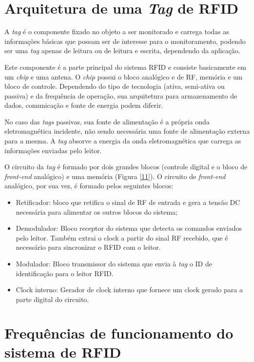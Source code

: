 
\section{Arquitetura de uma \textit{Tag} de RFID}

A \textit{tag} é o componente fixado no objeto a ser monitorado e carrega todas as informações básicas que possam ser de interesse para o monitoramento, podendo ser uma \textit{tag} apenas de leitura ou de leitura e escrita, dependendo da aplicação.

Este componente é a parte principal do sistema RFID e consiste basicamente em um \textit{chip} e uma antena. O \textit{chip} possui o bloco analógico e de RF, memória e um bloco de controle. Dependendo do tipo de tecnologia (ativa, semi-ativa ou passiva) e da frequência de operação, sua arquitetura para armazenamento de dados, comunicação e fonte de energia podem diferir. \cite{markham}

No caso das \textit{tags} passivas, sua fonte de alimentação é a própria onda eletromagnética incidente, não sendo necessária uma fonte de alimentação externa para a mesma. A \textit{tag} absorve a energia da onda eletromagnética que carrega as informações enviadas pelo  leitor.

O circuito da \textit{tag} é formado por dois grandes blocos (controle digital e o bloco de \textit{front-end} analógico) e uma memória (Figura \ref{11}). O circuito de \textit{front-end} analógico, por sua vez, é formado pelos seguintes blocos\cite{jose}:

\begin{itemize}

\item Retificador: bloco que retifica o sinal de RF de entrada e gera a tensão DC necessária para alimentar os outros blocos do sistema;
\item Demodulador: Bloco receptor do sistema que detecta os comandos enviados pelo leitor. Também extrai o clock a partir do sinal RF recebido, que é necessário para sincronizar o RFID com o leitor. 
\item Modulador: Bloco transmissor do sistema que envia à \textit{tag} o ID de identificação para o leitor RFID. 
\item Clock interno: Gerador de clock interno que fornece um clock gerado para a parte digital do circuito. 

\end{itemize}


\section{Frequências de funcionamento do sistema de RFID}


